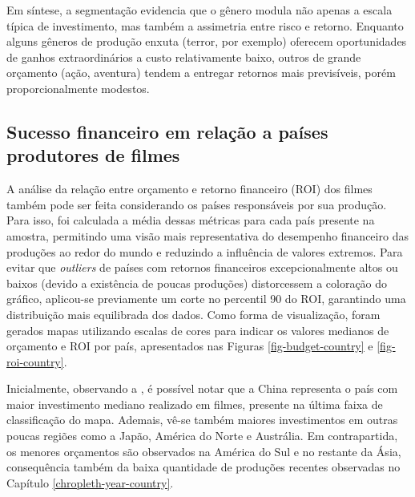 Em síntese, a segmentação evidencia que o gênero modula não apenas a escala típica de investimento, mas também a assimetria entre risco e retorno. Enquanto alguns gêneros de produção enxuta (terror, por exemplo) oferecem oportunidades de ganhos extraordinários a custo relativamente baixo, outros de grande orçamento (ação, aventura) tendem a entregar retornos mais previsíveis, porém proporcionalmente modestos.

%





\subsection{Sucesso financeiro em relação a países produtores de filmes}
A análise da relação entre orçamento e retorno financeiro (\acrshort{ROI}) dos filmes também pode ser feita considerando os países responsáveis por sua produção. Para isso, foi calculada a média dessas métricas para cada país presente na amostra, permitindo uma visão mais representativa do desempenho financeiro das produções ao redor do mundo e reduzindo a influência de valores extremos. Para evitar que \textit{outliers} de países com retornos financeiros excepcionalmente altos ou baixos (devido a existência de poucas produções) distorcessem a coloração do gráfico, aplicou-se previamente um corte no percentil 90 do \acrshort{ROI}, garantindo uma distribuição mais equilibrada dos dados. Como forma de visualização, foram gerados mapas utilizando escalas de cores para indicar os valores medianos de orçamento e \acrshort{ROI} por país, apresentados nas Figuras \ref{fig-budget-country} e \ref{fig-roi-country}.

%

%

Inicialmente, observando a , é possível notar que a China representa o país com maior investimento mediano realizado em filmes, presente na última faixa de classificação do mapa. Ademais, vê-se também maiores investimentos em outras poucas regiões como a Japão, América do Norte e Austrália. Em contrapartida, os menores orçamentos são observados na América do Sul e no restante da Ásia, consequência também da baixa quantidade de produções recentes observadas no Capítulo \ref{chropleth-year-country}.    


